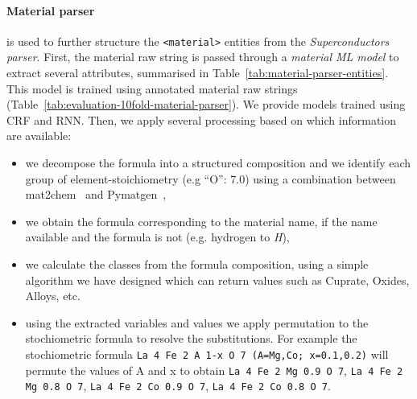 \documentclass{article}
\begin{document}
\paragraph{Material parser} is used to further structure the \texttt{<material>} entities from the \textit{Superconductors parser}. 
First, the material raw string is passed through a \textit{material ML model} to extract several attributes, summarised in Table~\ref{tab:material-parser-entities}. 
This model is trained using annotated material raw strings (Table~\ref{tab:evaluation-10fold-material-parser}). 
We provide models trained using CRF and RNN.
Then, we apply several processing based on which information are available: 
\begin{itemize}
    \item we decompose the formula into a structured composition and we identify each group of element-stoichiometry (e.g ``O'': 7.0) using a combination between mat2chem~\cite{kononova_text-mined_2019} and Pymatgen~\cite{Ong2013}, 
    \item we obtain the formula corresponding to the material name, if the name available and the formula is not (e.g. hydrogen to \textit{H}), 
    \item we calculate the classes from the formula composition, using a simple algorithm we have designed which can return values such as Cuprate, Oxides, Alloys, etc.
    \item using the extracted variables and values we apply permutation to the stochiometric formula to resolve the substitutions. For example the stochiometric formula \texttt{La 4 Fe 2 A 1-x O 7 (A=Mg,Co; x=0.1,0.2)} will permute the values of A and x to obtain \texttt{La 4 Fe 2 Mg 0.9 O 7}, \texttt{La 4 Fe 2 Mg 0.8 O 7}, \texttt{La 4 Fe 2 Co 0.9 O 7}, \texttt{La 4 Fe 2 Co 0.8 O 7}.
\end{itemize}
\end{document}
